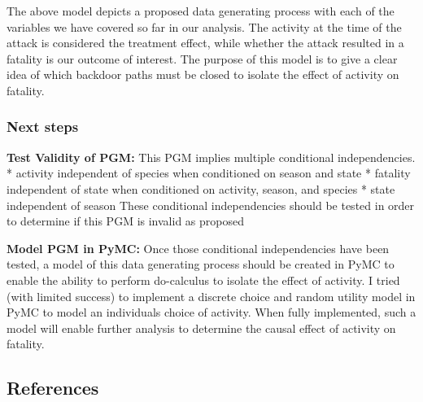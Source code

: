\documentclass[
  letterpaper,
  DIV=11,
  numbers=noendperiod]{scrartcl}
\begin{document}
The above model depicts a proposed data generating process with each of
the variables we have covered so far in our analysis. The activity at
the time of the attack is considered the treatment effect, while whether
the attack resulted in a fatality is our outcome of interest. The
purpose of this model is to give a clear idea of which backdoor paths
must be closed to isolate the effect of activity on fatality.

\subsubsection{Next steps}\label{next-steps}

\textbf{Test Validity of PGM:} This PGM implies multiple conditional
independencies. * activity independent of species when conditioned on
season and state * fatality independent of state when conditioned on
activity, season, and species * state independent of season These
conditional independencies should be tested in order to determine if
this PGM is invalid as proposed

\textbf{Model PGM in PyMC:} Once those conditional independencies have
been tested, a model of this data generating process should be created
in PyMC to enable the ability to perform do-calculus to isolate the
effect of activity. I tried (with limited success) to implement a
discrete choice and random utility model in PyMC to model an individuals
choice of activity. When fully implemented, such a model will enable
further analysis to determine the causal effect of activity on fatality.

\subsection{References}\label{references}
\end{document}

